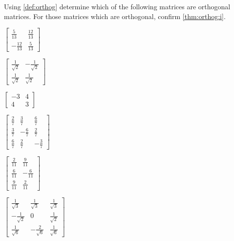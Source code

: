 \begin{exercise}  
Using \cref{def:orthog} determine which of the following matrices are orthogonal matrices.
For those matrices which are orthogonal, confirm \cref{thm:orthog:i}.
\begin{Parts}
\item \(\begin{bmatrix} \frac5{13}&\frac{12}{13}
\\-\frac{12}{13}&\frac5{13} \end{bmatrix}\)

\begin{OmitV1}
\item \(\begin{bmatrix} \frac1{\sqrt2}&-\frac1{\sqrt2}
\\\frac1{\sqrt2}&\frac1{\sqrt2} \end{bmatrix}\)
\end{OmitV1}

\item \(\begin{bmatrix} -3&4
\\4&3 \end{bmatrix}\)

\item \(\begin{bmatrix} \frac27&\frac37&\frac67
\\\frac37&-\frac67&\frac27
\\\frac67&\frac27&-\frac37 \end{bmatrix}\)

\item \(\begin{bmatrix} \frac2{11}&\frac9{11}
\\\frac6{11}&-\frac6{11}
\\\frac9{11}&\frac2{11} \end{bmatrix}\)

\begin{OmitV1}
\item \(\begin{bmatrix} \frac1{\sqrt3}&\frac1{\sqrt3}&\frac1{\sqrt3}
\\-\frac1{\sqrt2}&0&\frac1{\sqrt2}
\\\frac1{\sqrt6}&-\frac2{\sqrt6}&\frac1{\sqrt6} \end{bmatrix}\)


\end{OmitV1}
\end{Parts}
\end{exercise}
